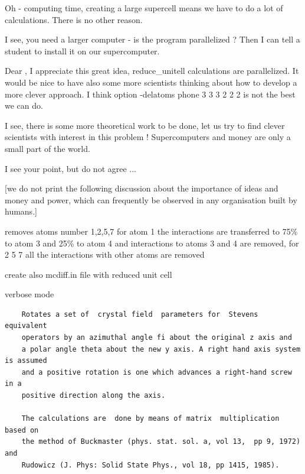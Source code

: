 \begin{description}
\begin{description}
\EE Oh - computing time, creating a large supercell means we have to do a lot of
calculations. There is no other reason.

\PP I see, you need a larger computer - is the program parallelized ? Then I can
tell a student to install it on our supercomputer.

\EE Dear \pp, I appreciate this great idea, reduce\_unitell calculations are parallelized.
   It would be nice to have also some more scientists thinking about how
   to develop a more clever approach. I think option {\prg -delatoms phone 3 3 3 2 2 2}
   is not the best we can do.

\OO I see, there is some more theoretical work to be done, let us try to find
   clever scientists with interest in this problem ! 
   Supercomputers and money are only a small part of the world.

\PP I see your point, but do not agree ... 
  
  [we do not print the following discussion about the importance of
   ideas and money and power, which can frequently be observed in any organisation built
   by humans.]
          
\item[Option: -delatoms 1:3+-0.75:4+-0.25,2,5,7]  removes atoms number 1,2,5,7 for atom 1 the interactions
 			 are transferred to 75\% to atom 3 and 25\% to atom 4 and interactions to atoms 3 and 4 are
 			 removed, for 2 5 7 all the interactions with other atoms are removed
\item[Option: -mcdiff ] create also mcdiff.in file with reduced unit cell
\item[Option: -v ] verbose mode
\end{description}
\item [\prg rotateBlm\index{rotateBlm}\label{rotateBlm}]
  \begin{verbatim}
    Rotates a set of  crystal field  parameters for  Stevens equivalent
    operators by an azimuthal angle fi about the original z axis and
    a polar angle theta about the new y axis. A right hand axis system is assumed
    and a positive rotation is one which advances a right-hand screw in a
    positive direction along the axis.

    The calculations are  done by means of matrix  multiplication based on
    the method of Buckmaster (phys. stat. sol. a, vol 13,  pp 9, 1972) and
    Rudowicz (J. Phys: Solid State Phys., vol 18, pp 1415, 1985).   


\end{verbatim}
\end{description}
